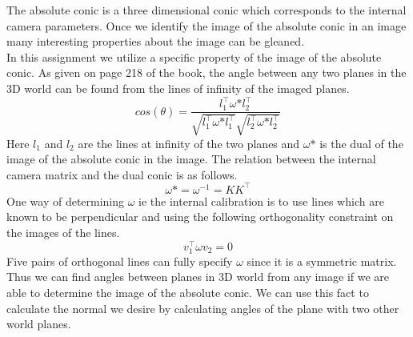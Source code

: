 \documentclass[12pt]{article}
\begin{document}
The absolute conic is a three dimensional conic which corresponds to the internal camera parameters. Once we identify the image of the absolute conic in an image many interesting properties about the image can be gleaned.\\ In this assignment we utilize a specific property of the image of the absolute conic. As given on page 218 of the book, the angle between any two planes in the 3D world can be found from the lines of infinity of the imaged planes. 
$$ cos(\theta) = \dfrac{l_1^\top \omega \mbox{*} l_2^\top}{\sqrt{l_1^\top \omega \mbox{*} l_1^\top}\sqrt{l_2^\top \omega \mbox{*} l_2^\top}}$$
Here $l_1$ and $l_2$ are the lines at infinity of the two planes and $\omega \mbox{*}$ is the dual of the image of the absolute conic in the image. The relation between the internal camera matrix and the dual conic is as follows.
$$ \omega \mbox{*} = \omega^{-1} = K K^\top$$
One way of determining $\omega$ ie the internal calibration is to use lines which are known to be perpendicular and using the following orthogonality constraint on the images of the lines.
$$  v_1^\top \omega v_2= 0$$
Five pairs of orthogonal lines can fully specify $\omega$ since it is a symmetric matrix. Thus we can find angles between planes in 3D world from any image if we are able to determine the image of the absolute conic. We can use this fact to calculate the normal we desire by calculating angles of the plane with two other world planes. 
\end{document}

